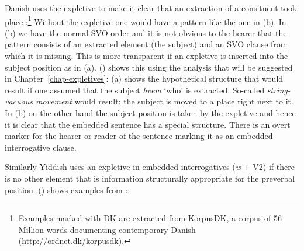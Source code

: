 Danish uses the expletive to make it clear that an extraction of a consituent took place
\citep[]{MOe2011a}:\footnote{
  Examples marked with DK are extracted from KorpusDK, a corpus of 56 Million words documenting
  contemporary Danish (\url{http://ordnet.dk/korpusdk}).
}
\eal
{}
\zl
Without the expletive one would have a pattern like the one in (b). In (b) we have the
normal SVO order and it is not obvious to the hearer that the pattern consists of an extracted
element (the subject) and an SVO clause from which it is missing. This is more transparent if an
expletive is inserted into the subject position as in (a). () shows this using the
analysis that will be suggested in Chapter~\ref{chap-expletives}: (a) shows the hypothetical
structure that would result if one assumed that the subject \emph{hvem} `who' is
extracted. So-called \emph{string-vacuous movement} would result: the subject is moved to a place
right next to it. In (b) on the other hand the subject position is taken by the expletive and
hence it is clear that the embedded sentence has a special structure. There is an overt marker for
the hearer or reader of the sentence marking it as an embedded interrogative clause.
\eal
{}
\zl

Similarly Yiddish uses an expletive in embedded interrogatives (\emph{w} + V2) if 
there is no other element that is information structurally appropriate for the preverbal position.
() shows examples from \citet[--404]{Prince89a}:

